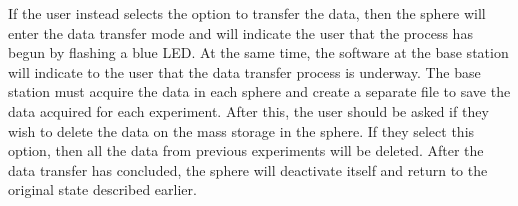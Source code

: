 If the user instead selects the option to transfer the data, then the sphere will enter the data transfer mode and will indicate the user that the process has begun by flashing a blue LED.  At the same time, the software at the base station will indicate to the user that the data transfer process is underway.  The base station must acquire the data in each sphere and create a separate file to save the data acquired for each experiment.  After this, the user should be asked if they wish to delete the data on the mass storage in the sphere.  If they select this option, then all the data from previous experiments will be deleted.  After the data transfer has concluded, the sphere will deactivate itself and return to the original state described earlier.





